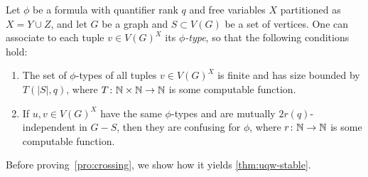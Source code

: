 \begin{proposition}\label{pro:crossing}	
	Let $\phi$ be a formula with
 quantifier rank $q$ and
   free variables $X$
 partitioned as $X=Y\cup Z$, and let $G$ be a graph and $S\subset V(G)$ be a set of vertices.
One can associate to each tuple $v\in V(G)^X$
its \emph{$\phi$-type}, so that the following conditions 
hold:
	 \begin{enumerate}		 
	 	\item The  set of  $\phi$-types  of all tuples $v\in V(G)^X$  is finite and has size bounded by 
    $T(|S|,q)$, where $T\colon \mathbb{N}\times \mathbb{N}\to \mathbb{N}$ is some computable function.
		

		
	 	\item 
  If $u,v\in V(G)^X$ have the same $\phi$-types and are mutually $2r(q)$-independent in $G-S$, then they are confusing for $\phi$, where
  $r\colon \mathbb{N} \to \mathbb{N}$ is some computable function.
	 \end{enumerate}
\end{proposition}

Before proving~\cref{pro:crossing}, we show how it yields  \cref{thm:uqw-stable}. 

